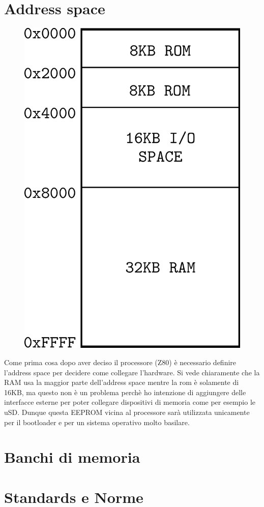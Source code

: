 \documentclass[final, ms, a4paper, 11pt]{memoir}
\newcommand\ddate{01.01.1970}
\begin{document}
\renewcommand\ddate{13.02.2017}
\section{Address space}
\begin{figure} \centering
    \includegraphics[width=.9\linewidth]{res/addrspace.pdf}
\end{figure}
Come prima cosa dopo aver deciso il processore (Z80) \`e necessario definire
l'address space per decidere come collegare l'hardware. Si vede chiaramente che
la RAM usa la maggior parte dell'address space mentre la rom \`e solamente di
16KB, ma questo non \`e un problema perch\`e ho intenzione di aggiungere delle
interfacce esterne per poter collegare dispositivi di memoria come per esempio
le uSD. Dunque questa EEPROM vicina al processore sar\`a utilizzata unicamente
per il bootloader e per un sistema operativo molto basilare.

\renewcommand\ddate{23.02.2017}
\section{Banchi di memoria}

\renewcommand\ddate{04.03.2017}
\section{Standards e  Norme}
\end{document}
